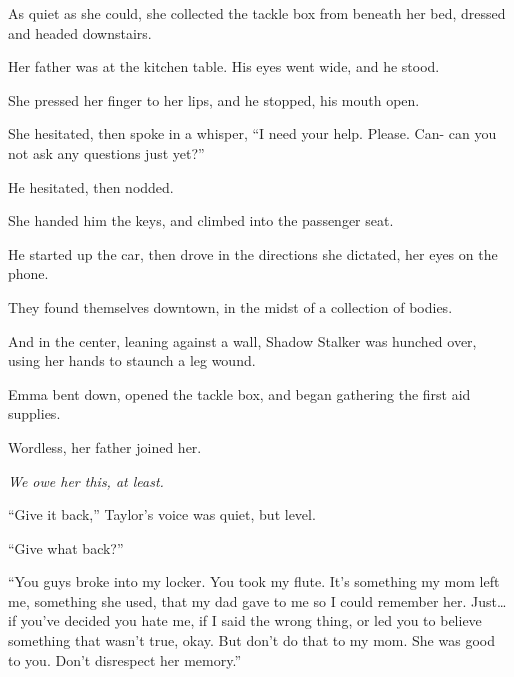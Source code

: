 As quiet as she could, she collected the tackle box from beneath her bed, dressed and headed downstairs.



Her father was at the kitchen table.  His eyes went wide, and he stood.



She pressed her finger to her lips, and he stopped, his mouth open.



She hesitated, then spoke in a whisper, ``I need your help.  Please.  Can- can you not ask any questions just yet?''



He hesitated, then nodded.



She handed him the keys, and climbed into the passenger seat.



He started up the car, then drove in the directions she dictated, her eyes on the phone.



They found themselves downtown, in the midst of a collection of bodies.



And in the center, leaning against a wall, Shadow Stalker was hunched over, using her hands to staunch a leg wound.



Emma bent down, opened the tackle box, and began gathering the first aid supplies.



Wordless, her father joined her.



\emph{We owe her this, at least.}



\blacksquare



``Give it back,'' Taylor's voice was quiet, but level.



``Give what back?''



``You guys broke into my locker.  You took my flute.  It's something my mom left me, something she used, that my dad gave to me so I could remember her.  Just\ldots if you've decided you hate me, if I said the wrong thing, or led you to believe something that wasn't true, okay.  But don't do that to my mom.  She was good to you.  Don't disrespect her memory.''



